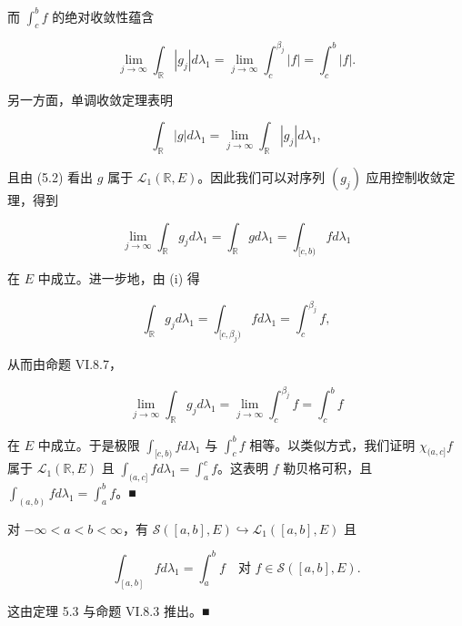 \begin{theorem}
\begin{subitems}
而 $ \int_{c}^{b} f $ 的绝对收敛性蕴含

\begin{equation}
\lim_{j \to \infty} \int_{\mathbb{R}} |g_{j}| d\lambda_{1} = \lim_{j \to \infty} \int_{c}^{\beta_{j}} |f| = \int_{c}^{b} |f| .\tag{5.2}
\end{equation}

另一方面，单调收敛定理表明

\[
\int_{\mathbb{R}} |g| d\lambda_{1} = \lim_{j \to \infty} \int_{\mathbb{R}} |g_{j}| d\lambda_{1} ,
\]

且由 (5.2) 看出 $ g $ 属于 $ \mathcal{L}_{1}(\mathbb{R},E) $。因此我们可以对序列 $ (g_{j}) $ 应用控制收敛定理，得到

\[
\lim_{j \to \infty} \int_{\mathbb{R}} g_{j} d\lambda_{1} = \int_{\mathbb{R}} g d\lambda_{1} = \int_{[c,b)} f d\lambda_{1}
\]

在 $ E $ 中成立。进一步地，由 (i) 得

\[
\int_{\mathbb{R}} g_{j} d\lambda_{1} = \int_{[c,\beta_{j})} f d\lambda_{1} = \int_{c}^{\beta_{j}} f ,
\]

从而由命题 VI.8.7，

\[
\lim_{j \to \infty} \int_{\mathbb{R}} g_{j} d\lambda_{1} = \lim_{j \to \infty} \int_{c}^{\beta_{j}} f = \int_{c}^{b} f
\]

在 $ E $ 中成立。于是极限 $ \int_{[c,b)} f d\lambda_{1} $ 与 $ \int_{c}^{b} f $ 相等。以类似方式，我们证明 $ \chi_{(a,c]}f $ 属于 $ \mathcal{L}_{1}(\mathbb{R},E) $ 且 $ \int_{(a,c]} f d\lambda_{1} = \int_{a}^{c} f $。这表明 $ f $ 勒贝格可积，且 $ \int_{(a,b)} f d\lambda_{1} = \int_{a}^{b} f $。\nobreak\hspace{0.35em}■

\end{subitems}

\end{theorem}

\begin{corollary}

对 $ -\infty < a < b < \infty $，有 $ \mathcal{S}([a,b],E) \hookrightarrow \mathcal{L}_{1}([a,b],E) $ 且

\[
\int_{[a,b]} f d\lambda_{1} = \int_{a}^{b} f \quad \text{对 } f \in \mathcal{S}([a,b],E) .
\]

\proofhead
这由定理 5.3 与命题 VI.8.3 推出。\nobreak\hspace{0.35em}■
\end{corollary}

